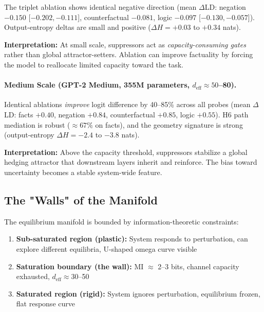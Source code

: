 The triplet ablation shows identical negative direction (mean $\Delta$LD: negation $-0.150$ [$-0.202, -0.111$], counterfactual $-0.081$, logic $-0.097$ [$-0.130, -0.057$]). Output-entropy deltas are small and positive ($\Delta H = +0.03$ to $+0.34$ nats).

\textbf{Interpretation:} At small scale, suppressors act as \emph{capacity-consuming gates} rather than global attractor-setters. Ablation can improve factuality by forcing the model to reallocate limited capacity toward the task.

\paragraph{Medium Scale (GPT-2 Medium, 355M parameters, $d_{\text{eff}} \approx 50$--80).}
Identical ablations \emph{improve} logit difference by 40--85\% across all probes (mean $\Delta$LD: facts $+0.40$, negation $+0.84$, counterfactual $+0.85$, logic $+0.55$). H6 path mediation is robust ($\approx 67\%$ on facts), and the geometry signature is strong (output-entropy $\Delta H = -2.4$ to $-3.8$ nats).

\textbf{Interpretation:} Above the capacity threshold, suppressors stabilize a global hedging attractor that downstream layers inherit and reinforce. The bias toward uncertainty becomes a stable system-wide feature.

\subsection{The "Walls" of the Manifold}

The equilibrium manifold is bounded by information-theoretic constraints:
\begin{enumerate}
\item \textbf{Sub-saturated region (plastic):} System responds to perturbation, can explore different equilibria, U-shaped omega curve visible
\item \textbf{Saturation boundary (the wall):} MI $\approx$ 2--3 bits, channel capacity exhausted, $d_{\text{eff}} \approx 30$--50
\item \textbf{Saturated region (rigid):} System ignores perturbation, equilibrium frozen, flat response curve
\end{enumerate}

